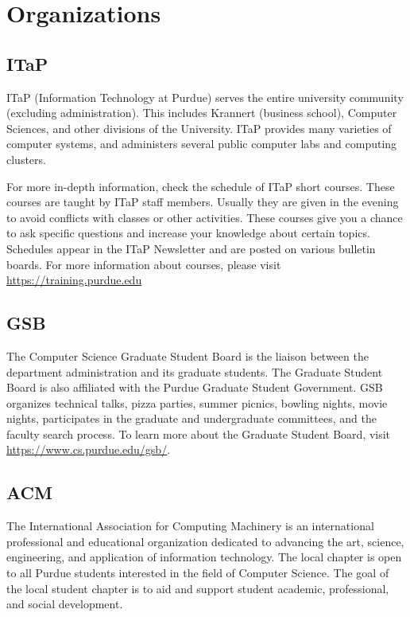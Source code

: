 \section{Organizations}

\subsection{ITaP}
ITaP (Information Technology at Purdue) serves the entire university community (excluding administration). This includes Krannert (business school), Computer Sciences, and other divisions of the University. ITaP provides many varieties of computer systems, and administers several public computer labs and computing clusters.

For more in-depth information, check the schedule of ITaP short courses. These courses are taught by ITaP staff members. Usually they are given in the evening to avoid conflicts with classes or other activities. These courses give you a chance to ask specific questions and increase your knowledge about certain topics. Schedules appear in the ITaP Newsletter and are posted on various bulletin boards. For more information about courses, please visit \url{https://training.purdue.edu}



\subsection{GSB}
The Computer Science Graduate Student Board is the liaison between the department administration and its graduate students. The Graduate Student Board is also affiliated with the Purdue Graduate Student Government. GSB organizes technical talks, pizza parties, summer picnics, bowling nights, movie nights, participates in the graduate and undergraduate committees, and the faculty search process. To learn more about the Graduate Student Board, visit \url{https://www.cs.purdue.edu/gsb/}.



\subsection{ACM}
The International Association for Computing Machinery is an international professional and educational organization dedicated to advancing the art, science, engineering, and application of information technology. The local chapter is open to all Purdue students interested in the field of Computer Science. The goal of the local student chapter is to aid and support student academic, professional, and social development.


